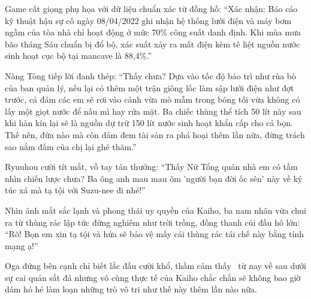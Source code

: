 \documentclass[../main.tex]{subfiles}
\begin{document}
Game cất giọng phụ họa với dữ liệu chuẩn xác từ đồng hồ: ``Xác nhận: Báo cáo kỹ thuật hậu sự cố ngày 08/04/2022 ghi nhận hệ thống lưới điện và máy bơm ngầm của tòa nhà chỉ hoạt động ở mức 70\% công suất danh định. Khi mùa mưa bão tháng Sáu chuẩn bị đổ bộ, xác suất xảy ra mất điện kèm tê liệt nguồn nước sinh hoạt cục bộ tại mancave là 88,4\%.''

Nàng Tỏng tiếp lời đanh thép: ``Thấy chưa? Dựa vào tốc độ bảo trì như rùa bò của ban quản lý, nếu lại có thêm một trận giông lốc làm sập lưới điện như đợt trước, cả đám các em sẽ rơi vào cảnh vừa mò mẫm trong bóng tối vừa không có lấy một giọt nước để nấu mì hay rửa mặt. Ba chiếc thùng thể tích 50 lít này sau khi hàn kín lại sẽ là nguồn dự trữ 150 lít nước sinh hoạt khẩn cấp cho cả bọn. Thế nên, đứa nào mà còn dám đem tài sản ra phá hoại thêm lần nữa, đừng trách sao nắm đấm của chị lại ghé thăm.''

Ryuuhou cười tít mắt, vỗ tay tán thưởng: ``Thấy Nữ Tổng quản nhà em có tầm nhìn chiến lược chưa? Ba ông anh mau mau ôm 'người bạn đời ốc sên' này về ký túc xá mà tạ tội với Suzu-nee đi nhé!''

Nhìn ánh mắt sắc lạnh và phong thái uy quyền của Kaiho, ba nam nhân vừa chui ra từ thùng rác lập tức đứng nghiêm như trời trồng, đồng thanh cúi đầu hô lớn: ``Rõ! Bọn em xin tạ tội và hứa sẽ bảo vệ mấy cái thùng rác tái chế này bằng tính mạng ạ!''

Oga đứng bên cạnh chỉ biết lắc đầu cười khổ, thầm cảm thấy \hls\ từ nay về sau dưới sự cai quản sắt đá nhưng vô cùng thực tế của Kaiho chắc chắn sẽ không bao giờ dám hó hé làm loạn những trò vô tri như thế này thêm lần nào nữa.
\end{document}
